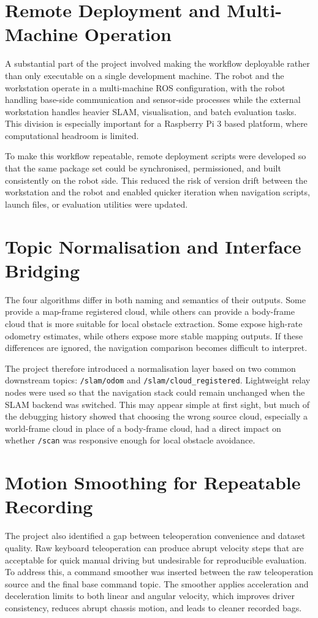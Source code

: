 \documentclass[12pt,a4paper]{report}
\begin{document}
\section{Remote Deployment and Multi-Machine Operation}
A substantial part of the project involved making the workflow deployable rather than only executable on a single development machine. The robot and the workstation operate in a multi-machine ROS configuration, with the robot handling base-side communication and sensor-side processes while the external workstation handles heavier SLAM, visualisation, and batch evaluation tasks. This division is especially important for a Raspberry Pi 3 based platform, where computational headroom is limited.

To make this workflow repeatable, remote deployment scripts were developed so that the same package set could be synchronised, permissioned, and built consistently on the robot side. This reduced the risk of version drift between the workstation and the robot and enabled quicker iteration when navigation scripts, launch files, or evaluation utilities were updated.

\section{Topic Normalisation and Interface Bridging}
The four algorithms differ in both naming and semantics of their outputs. Some provide a map-frame registered cloud, while others can provide a body-frame cloud that is more suitable for local obstacle extraction. Some expose high-rate odometry estimates, while others expose more stable mapping outputs. If these differences are ignored, the navigation comparison becomes difficult to interpret.

The project therefore introduced a normalisation layer based on two common downstream topics: \texttt{/slam/odom} and \texttt{/slam/cloud\_registered}. Lightweight relay nodes were used so that the navigation stack could remain unchanged when the SLAM backend was switched. This may appear simple at first sight, but much of the debugging history showed that choosing the wrong source cloud, especially a world-frame cloud in place of a body-frame cloud, had a direct impact on whether \texttt{/scan} was responsive enough for local obstacle avoidance.

\section{Motion Smoothing for Repeatable Recording}
The project also identified a gap between teleoperation convenience and dataset quality. Raw keyboard teleoperation can produce abrupt velocity steps that are acceptable for quick manual driving but undesirable for reproducible evaluation. To address this, a command smoother was inserted between the raw teleoperation source and the final base command topic. The smoother applies acceleration and deceleration limits to both linear and angular velocity, which improves driver consistency, reduces abrupt chassis motion, and leads to cleaner recorded bags.
\end{document}

